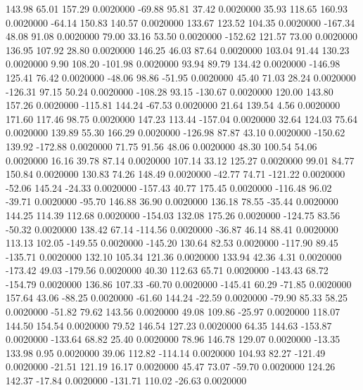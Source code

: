   143.98   65.01  157.29   0.0020000
  -69.88   95.81   37.42   0.0020000
   35.93  118.65  160.93   0.0020000
  -64.14  150.83  140.57   0.0020000
  133.67  123.52  104.35   0.0020000
 -167.34   48.08   91.08   0.0020000
   79.00   33.16   53.50   0.0020000
 -152.62  121.57   73.00   0.0020000
  136.95  107.92   28.80   0.0020000
  146.25   46.03   87.64   0.0020000
  103.04   91.44  130.23   0.0020000
    9.90  108.20 -101.98   0.0020000
   93.94   89.79  134.42   0.0020000
 -146.98  125.41   76.42   0.0020000
  -48.06   98.86  -51.95   0.0020000
   45.40   71.03   28.24   0.0020000
 -126.31   97.15   50.24   0.0020000
 -108.28   93.15 -130.67   0.0020000
  120.00  143.80  157.26   0.0020000
 -115.81  144.24  -67.53   0.0020000
   21.64  139.54    4.56   0.0020000
  171.60  117.46   98.75   0.0020000
  147.23  113.44 -157.04   0.0020000
   32.64  124.03   75.64   0.0020000
  139.89   55.30  166.29   0.0020000
 -126.98   87.87   43.10   0.0020000
 -150.62  139.92 -172.88   0.0020000
   71.75   91.56   48.06   0.0020000
   48.30  100.54   54.06   0.0020000
   16.16   39.78   87.14   0.0020000
  107.14   33.12  125.27   0.0020000
   99.01   84.77  150.84   0.0020000
  130.83   74.26  148.49   0.0020000
  -42.77   74.71 -121.22   0.0020000
  -52.06  145.24  -24.33   0.0020000
 -157.43   40.77  175.45   0.0020000
 -116.48   96.02  -39.71   0.0020000
  -95.70  146.88   36.90   0.0020000
  136.18   78.55  -35.44   0.0020000
  144.25  114.39  112.68   0.0020000
 -154.03  132.08  175.26   0.0020000
 -124.75   83.56  -50.32   0.0020000
  138.42   67.14 -114.56   0.0020000
  -36.87   46.14   88.41   0.0020000
  113.13  102.05 -149.55   0.0020000
 -145.20  130.64   82.53   0.0020000
 -117.90   89.45 -135.71   0.0020000
  132.10  105.34  121.36   0.0020000
  133.94   42.36    4.31   0.0020000
 -173.42   49.03 -179.56   0.0020000
   40.30  112.63   65.71   0.0020000
 -143.43   68.72 -154.79   0.0020000
  136.86  107.33  -60.70   0.0020000
 -145.41   60.29  -71.85   0.0020000
  157.64   43.06  -88.25   0.0020000
  -61.60  144.24  -22.59   0.0020000
  -79.90   85.33   58.25   0.0020000
  -51.82   79.62  143.56   0.0020000
   49.08  109.86  -25.97   0.0020000
  118.07  144.50  154.54   0.0020000
   79.52  146.54  127.23   0.0020000
   64.35  144.63 -153.87   0.0020000
 -133.64   68.82   25.40   0.0020000
   78.96  146.78  129.07   0.0020000
  -13.35  133.98    0.95   0.0020000
   39.06  112.82 -114.14   0.0020000
  104.93   82.27 -121.49   0.0020000
  -21.51  121.19   16.17   0.0020000
   45.47   73.07  -59.70   0.0020000
  124.26  142.37  -17.84   0.0020000
 -131.71  110.02  -26.63   0.0020000
